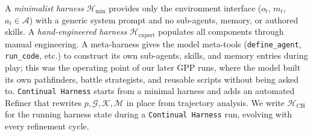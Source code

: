 A \emph{minimalist harness} $\mathcal{H}_{\min}$ provides only the environment interface ($o_t$, $m_t$, $a_t \in \mathcal{A}$) with a generic system prompt and no sub-agents, memory, or authored skills. A \emph{hand-engineered harness} $\mathcal{H}_\mathrm{expert}$ populates all components through manual engineering. A meta-harness gives the model meta-tools (\texttt{define\_agent}, \texttt{run\_code}, etc.) to construct its own sub-agents, skills, and memory entries during play; this was the operating point of our later GPP runs, where the model built its own pathfinders, battle strategists, and reusable scripts without being asked to. \texttt{Continual Harness} starts from a minimal harness and adds an automated Refiner that rewrites $p, \mathcal{G}, \mathcal{K}, \mathcal{M}$ in place from trajectory analysis. We write $\mathcal{H}_\mathrm{CH}$ for the running harness state during a \texttt{Continual Harness} run, evolving with every refinement cycle.